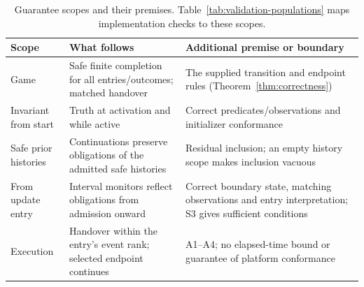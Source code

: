 \begin{table}[!htbp]
\caption{Guarantee scopes and their premises. Table~\ref{tab:validation-populations} maps implementation checks to these scopes.}
\label{tab:guarantee-evidence}
\centering\small
\begin{tabular}{@{}>{\raggedright\arraybackslash}p{.18\linewidth}>{\raggedright\arraybackslash}p{.40\linewidth}>{\raggedright\arraybackslash}p{.36\linewidth}@{}}\toprule
Scope & What follows & Additional premise or boundary\\\midrule
Game & Safe finite completion for all entries/outcomes; matched handover & The supplied transition and endpoint rules (Theorem~\ref{thm:correctness})\\
Invariant from start & Truth at activation and while active & Correct predicates/observations and initializer conformance\\
Safe prior histories & Continuations preserve obligations of the admitted safe histories & Residual inclusion; an empty history scope makes inclusion vacuous\\
From update entry & Interval monitors reflect obligations from admission onward & Correct boundary state, matching observations and entry interpretation; S3 gives sufficient conditions\\
Execution & Handover within the entry's event rank; selected endpoint continues & A1--A4; no elapsed-time bound or guarantee of platform conformance\\\bottomrule
\end{tabular}
\end{table}
